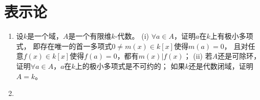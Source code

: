 \setcounter{section}{8}
\section{表示论}
\begin{enumerate}
\item[9.4] 设$k$是一个域，$A$是一个有限维$k$-代数。
(i) $\forall a\in A$，证明$a$在$k$上有极小多项式，
即存在唯一的首一多项式$0\ne m(x)\in k[x]$使得$m(a)=0$，
且对任意$f(x)\in k[x]$使得$f(a)=0$，都有$m(x)|f(x)$；
(ii) 若$A$还是可除环，证明$\forall a\in A$，$a$在$k$上的极小多项式是不可约的；
如果$k$还是代数闭域，证明$A=k$。
\item[\textbf{证明:}]


\end{enumerate}
